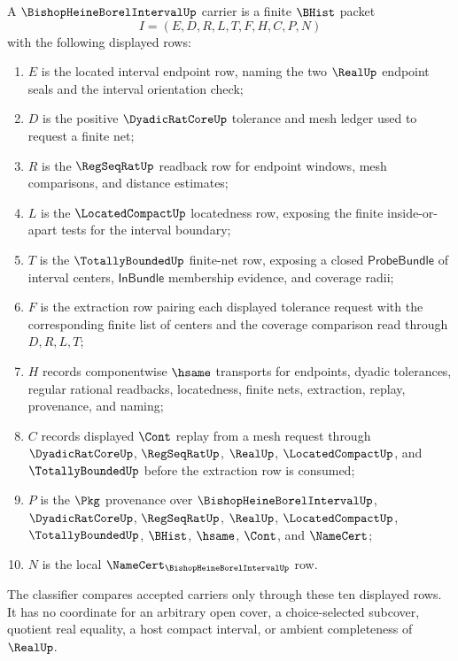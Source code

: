 \begin{definition}
\label{def:located-compactness-net-extraction-carrier}
A $\BishopHeineBorelIntervalUp$ carrier is a finite $\BHist$ packet
$$
I=(E,D,R,L,T,F,H,C,P,N)
$$
with the following displayed rows:
\begin{enumerate}
\item $E$ is the located interval endpoint row, naming the two $\RealUp$ endpoint seals and the interval orientation check;
\item $D$ is the positive $\DyadicRatCoreUp$ tolerance and mesh ledger used to request a finite net;
\item $R$ is the $\RegSeqRatUp$ readback row for endpoint windows, mesh comparisons, and distance estimates;
\item $L$ is the $\LocatedCompactUp$ locatedness row, exposing the finite inside-or-apart tests for the interval boundary;
\item $T$ is the $\TotallyBoundedUp$ finite-net row, exposing a closed $\mathsf{ProbeBundle}$ of interval centers, $\mathsf{InBundle}$ membership evidence, and coverage radii;
\item $F$ is the extraction row pairing each displayed tolerance request with the corresponding finite list of centers and the coverage comparison read through $D,R,L,T$;
\item $H$ records componentwise $\hsame$ transports for endpoints, dyadic tolerances, regular rational readbacks, locatedness, finite nets, extraction, replay, provenance, and naming;
\item $C$ records displayed $\Cont$ replay from a mesh request through $\DyadicRatCoreUp$, $\RegSeqRatUp$, $\RealUp$, $\LocatedCompactUp$, and $\TotallyBoundedUp$ before the extraction row is consumed;
\item $P$ is the $\Pkg$ provenance over $\BishopHeineBorelIntervalUp$, $\DyadicRatCoreUp$, $\RegSeqRatUp$, $\RealUp$, $\LocatedCompactUp$, $\TotallyBoundedUp$, $\BHist$, $\hsame$, $\Cont$, and $\NameCert$;
\item $N$ is the local $\NameCert_{\BishopHeineBorelIntervalUp}$ row.
\end{enumerate}
The classifier compares accepted carriers only through these ten displayed rows. It has no coordinate for an arbitrary open cover, a choice-selected subcover, quotient real equality, a host compact interval, or ambient completeness of $\RealUp$.
\end{definition}

